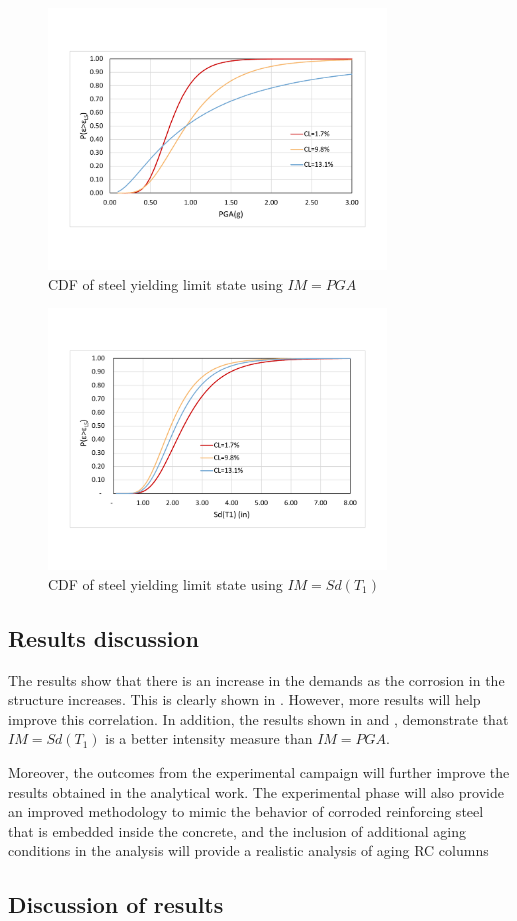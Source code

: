 \begin{figure}[htbp]
	\centering
	\includegraphics[width=0.8\textwidth]{Chapter-5/figs/CDF_PGA}
	\caption{CDF of steel yielding limit state using $IM=PGA$}
	\label{fig:CDF_SY_PGA}
\end{figure}
\begin{figure}[htbp]
	\centering
	\includegraphics[width=0.8\textwidth]{Chapter-5/figs/CDF_SdT1}
	\caption{CDF of steel yielding limit state using $IM=Sd(T_1)$}
	\label{fig:CDF_SY_SDT1}
\end{figure}
\newpage
\subsection{Results discussion}
The results show that there is an increase in the demands as the corrosion in the structure increases. This is clearly shown in . However, more results will help improve this correlation. In addition, the results shown in  and , demonstrate that $IM=Sd(T_1)$ is a better intensity measure than $IM=PGA$. 

Moreover, the outcomes from the experimental campaign will further improve the results obtained in the analytical work. The experimental phase will also provide an improved methodology to mimic the behavior of corroded reinforcing steel that is embedded inside the concrete, and the inclusion of additional aging conditions in the analysis will provide a realistic analysis of aging RC columns
\subsection{Discussion of results}